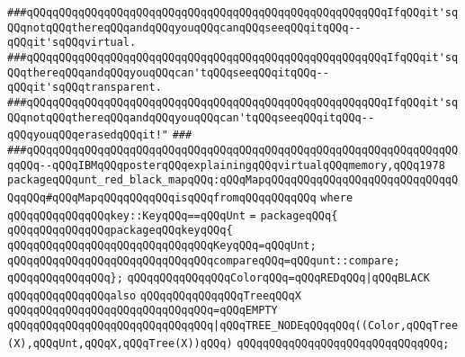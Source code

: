 \verb|###qQQqqQQqqQQqqQQqqQQqqQQqqQQqqQQqqQQqqQQqqQQqqQQqqQQqqQQqIfqQQqit'sqQQqnotqQQqthereqQQqandqQQqyouqQQqcanqQQqseeqQQqitqQQq--qQQqit'sqQQqvirtual.|\newline
\verb|###qQQqqQQqqQQqqQQqqQQqqQQqqQQqqQQqqQQqqQQqqQQqqQQqqQQqqQQqIfqQQqit'sqQQqthereqQQqandqQQqyouqQQqcan'tqQQqseeqQQqitqQQq--qQQqit'sqQQqtransparent.|\newline
\verb|###qQQqqQQqqQQqqQQqqQQqqQQqqQQqqQQqqQQqqQQqqQQqqQQqqQQqqQQqIfqQQqit'sqQQqnotqQQqthereqQQqandqQQqyouqQQqcan'tqQQqseeqQQqitqQQq--qQQqyouqQQqerasedqQQqit!"|\newline
\verb|###|\newline
\verb|###qQQqqQQqqQQqqQQqqQQqqQQqqQQqqQQqqQQqqQQqqQQqqQQqqQQqqQQqqQQqqQQqqQQqqQQq--qQQqIBMqQQqposterqQQqexplainingqQQqvirtualqQQqmemory,qQQq1978|\newline
\newline
\newline
\newline
\verb|packageqQQqunt_red_black_mapqQQq:qQQqMapqQQqqQQqqQQqqQQqqQQqqQQqqQQqqQQqqQQq#qQQqMapqQQqqQQqqQQqisqQQqfromqQQqqQQqqQQq|\newline
\verb|where|\newline
\verb|qQQqqQQqqQQqqQQqkey::KeyqQQq==qQQqUnt|\newline
\verb|=|\newline
\verb|packageqQQq{|\newline
\newline
\verb|qQQqqQQqqQQqqQQqpackageqQQqkeyqQQq{|\newline
\verb|qQQqqQQqqQQqqQQqqQQqqQQqqQQqqQQqKeyqQQq=qQQqUnt;|\newline
\verb|qQQqqQQqqQQqqQQqqQQqqQQqqQQqqQQqcompareqQQq=qQQqunt::compare;|\newline
\verb|qQQqqQQqqQQqqQQq};|\newline
\newline
\verb|qQQqqQQqqQQqqQQqColorqQQq=qQQqREDqQQq|\verb#|qQQqBLACK#\newline
\verb|qQQqqQQqqQQqqQQqalso|\newline
\verb|qQQqqQQqqQQqqQQqTreeqQQqX|\newline
\verb|qQQqqQQqqQQqqQQqqQQqqQQqqQQqqQQq=qQQqEMPTY|\newline
\verb|qQQqqQQqqQQqqQQqqQQqqQQqqQQqqQQq|\verb#|qQQqTREE_NODEqQQqqQQq((Color,qQQqTree(X),qQQqUnt,qQQqX,qQQqTree(X))qQQq)#\newline
\verb|qQQqqQQqqQQqqQQqqQQqqQQqqQQqqQQq;|\newline
